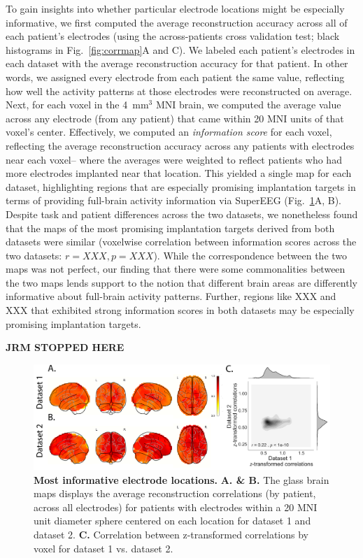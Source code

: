 \documentclass[11pt]{article}
\begin{document}
To gain insights into whether particular electrode locations might be
especially informative, we first computed the average reconstruction
accuracy across all of each patient's electrodes (using the
across-patients cross validation test; black histograms in
Fig.~\ref{fig:corrmap}A and C).  We labeled each patient's electrodes
in each dataset with the average reconstruction accuracy for that
patient.  In other words, we assigned every electrode from each
patient the same value, reflecting how well the activity patterns at
those electrodes were reconstructed on average.  Next, for each voxel
in the 4~mm$^3$ MNI brain, we computed the average value across any
electrode (from any patient) that came within 20 MNI units of that
voxel's center.  Effectively, we computed an \textit{information
  score} for each voxel, reflecting the average reconstruction
accuracy across any patients with electrodes near each voxel-- where
the averages were weighted to reflect patients who had more electrodes
implanted near that location. This yielded a single map for each
dataset, highlighting regions that are especially promising
implantation targets in terms of providing full-brain activity
information via SuperEEG (Fig.~\ref{fig:informap}A, B).  Despite task
and patient differences across the two datasets, we nonetheless found
that the maps of the most promising implantation targets derived from
both datasets were similar (voxelwise correlation between information
scores across the two datasets: $r = XXX, p = XXX$).  While the
correspondence between the two maps was not perfect, our finding that there were
some commonalities between the two maps lends support to the notion
that different brain areas are differently informative about
full-brain activity patterns.  Further, regions like XXX and XXX that
exhibited strong information scores in both datasets may be especially
promising implantation targets.

\textbf{JRM STOPPED HERE}

\begin{figure}
  \centering
  \includegraphics[width=\textwidth]{figs/informap}
  \caption{\textbf{Most informative electrode locations.} \textbf{A. \& B. } The glass
    brain maps displays the average reconstruction correlations (by patient, across
    all electrodes) for patients with electrodes within a 20 MNI unit diameter sphere centered on
    each location for dataset 1 and dataset 2. \textbf{C.} Correlation between z-transformed correlations by voxel for dataset 1 vs. dataset 2.}
  \label{fig:informap}
\end{figure}
\end{document}
